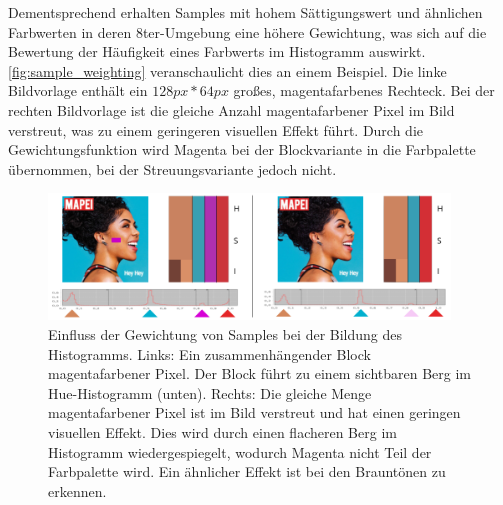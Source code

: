 Dementsprechend erhalten Samples mit hohem Sättigungswert und ähnlichen Farbwerten in deren 8ter-Umgebung eine höhere Gewichtung, was sich auf die Bewertung der Häufigkeit eines Farbwerts im Histogramm auswirkt. \autoref{fig:sample_weighting} veranschaulicht dies an einem Beispiel. Die linke Bildvorlage enthält ein $128px*64px$ großes, magentafarbenes Rechteck. Bei der rechten Bildvorlage ist die gleiche Anzahl magentafarbener Pixel im Bild verstreut, was zu einem geringeren visuellen Effekt führt. Durch die Gewichtungsfunktion wird Magenta bei der Blockvariante in die Farbpalette übernommen, bei der Streuungsvariante jedoch nicht.

\begin{figure}[h]
\centering
\includegraphics[width=0.95\textwidth]{img/sample_weighting.png}
\caption{Einfluss der Gewichtung von Samples bei der Bildung des Histogramms. Links: Ein zusammenhängender Block magentafarbener Pixel. Der Block führt zu einem sichtbaren Berg im Hue-Histogramm (unten). Rechts: Die gleiche Menge magentafarbener Pixel ist im Bild verstreut und hat einen geringen visuellen Effekt. Dies wird durch einen flacheren Berg im Histogramm wiedergespiegelt, wodurch Magenta nicht Teil der Farbpalette wird. Ein ähnlicher Effekt ist bei den Brauntönen zu erkennen.}
\label{fig:sample_weighting}
\end{figure}